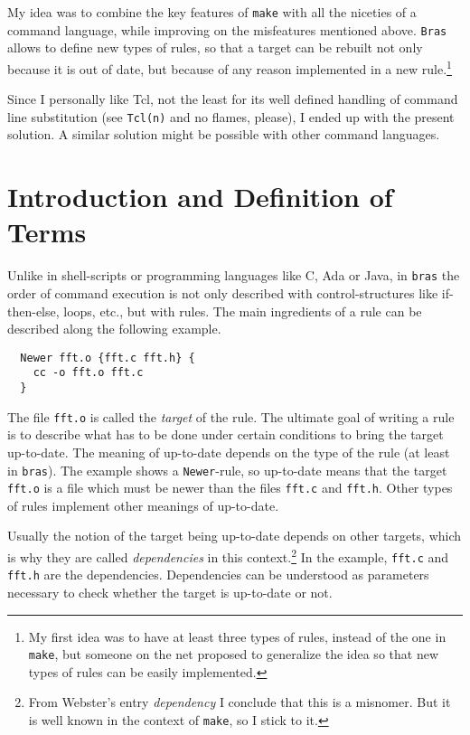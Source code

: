 \documentclass[12pt]{article}
\newcommand{\bras}{\texttt{bras}}
\newcommand{\Bras}{\texttt{Bras}}
\newcommand{\make}{\texttt{make}}
\begin{document}
My idea was to combine the key features of \texttt{make} with all the
niceties of a command language, while improving on the misfeatures
mentioned above. \Bras{} allows to define new types of
rules, so that a target can be rebuilt not only because it is out of
date, but because of any reason implemented in a new rule.\footnote{My
first idea was to have at least three types of rules, instead of the one
in \make{}, but someone on the net proposed to generalize the idea so
that new types of rules can be easily implemented.}

Since I personally like Tcl, not the least for its well defined
handling of command line substitution (see \texttt{Tcl(n)} and no
flames, please), I ended up with the present solution. A similar
solution might be possible with other command languages.


\section{Introduction and Definition of Terms}
\label{SecDefTerms}

Unlike in shell-scripts or programming languages like C, Ada or Java,
in \bras{} the order of command execution is not only described with
control-structures like if-then-else, loops, etc., but with rules.
The main ingredients of a rule can be described along the following
example.

\begin{verbatim}
  Newer fft.o {fft.c fft.h} {
    cc -o fft.o fft.c
  }
\end{verbatim}

The file \texttt{fft.o} is called the \textit{target} of the rule. The
ultimate goal of writing a rule is to describe what has to be done
under certain conditions to bring the target up-to-date. The meaning
of up-to-date depends on the type of the rule (at least in
\bras{}). The example shows a \texttt{Newer}-rule, so
up-to-date means that the target \texttt{fft.o} is a file which must
be newer than the files \texttt{fft.c} and \texttt{fft.h}. Other
types of rules implement other meanings of up-to-date.

Usually the notion of the target being up-to-date depends on other
targets, which is why they are called \textit{dependencies} in this
context.\footnote{From Webster's entry \textit{dependency} I conclude
  that this is a misnomer. But it is well known in the context of
  \make{}, so I stick to it.} In the example, \texttt{fft.c} and
\texttt{fft.h} are the dependencies.  Dependencies can be understood
as parameters necessary to check whether the target is up-to-date or
not.
\end{document}
